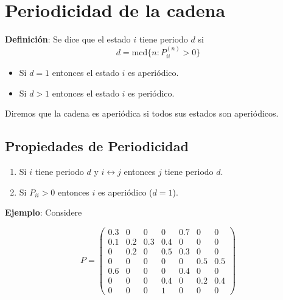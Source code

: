 \documentclass[12pt,a4paper]{article}
\begin{document}
\section*{Periodicidad de la cadena}

\textbf{Definición}: Se dice que el estado $i$ tiene periodo $d$ si
\begin{equation}
d = \text{mcd} \{n: P_{ii}^{(n)} > 0\}
\end{equation}

\begin{itemize}
    \item Si $d=1$ entonces el estado $i$ es aperiódico.
    \item Si $d>1$ entonces el estado $i$ es periódico.
\end{itemize}

Diremos que la cadena es aperiódica si todos sus estados son aperiódicos.

\subsection*{Propiedades de Periodicidad}

\begin{enumerate}
    \item Si $i$ tiene periodo $d$ y $i \leftrightarrow j$ entonces $j$ tiene periodo $d$.
    \item Si $P_{ii} > 0$ entonces $i$ es aperiódico ($d=1$).
\end{enumerate}

\textbf{Ejemplo}: Considere

\begin{equation*}
P = \begin{pmatrix}
0.3 & 0 & 0 & 0 & 0.7 & 0 & 0 \\
0.1 & 0.2 & 0.3 & 0.4 & 0 & 0 & 0 \\
0 & 0.2 & 0 & 0.5 & 0.3 & 0 & 0 \\
0 & 0 & 0 & 0 & 0 & 0.5 & 0.5 \\
0.6 & 0 & 0 & 0 & 0.4 & 0 & 0 \\
0 & 0 & 0 & 0.4 & 0 & 0.2 & 0.4 \\
0 & 0 & 0 & 1 & 0 & 0 & 0
\end{pmatrix}
\end{equation*}
\end{document}
